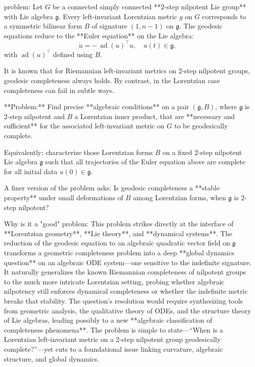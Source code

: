 problem:  
Let \(G\) be a connected simply connected **2-step nilpotent Lie group** with Lie algebra \(\mathfrak{g}\).  
Every left-invariant Lorentzian metric \(g\) on \(G\) corresponds to a symmetric bilinear form \(B\) of signature \((1, n-1)\) on \(\mathfrak{g}\). The geodesic equations reduce to the **Euler equation** on the Lie algebra:  
\[
\dot{u} = -\,\operatorname{ad}(u)^{\top}u, \quad u(t)\in \mathfrak{g},
\]
with \(\operatorname{ad}(u)^{\top}\) defined using \(B\).  

It is known that for Riemannian left-invariant metrics on 2-step nilpotent groups, geodesic completeness always holds. By contrast, in the Lorentzian case completeness can fail in subtle ways.  

**Problem:**  
Find precise **algebraic conditions** on a pair \((\mathfrak{g}, B)\), where \(\mathfrak{g}\) is 2-step nilpotent and \(B\) a Lorentzian inner product, that are **necessary and sufficient** for the associated left-invariant metric on \(G\) to be geodesically complete.  

Equivalently: characterize those Lorentzian forms \(B\) on a fixed 2-step nilpotent Lie algebra \(\mathfrak{g}\) such that all trajectories of the Euler equation above are complete for all initial data \(u(0)\in \mathfrak{g}\).  

A finer version of the problem asks:  
Is geodesic completeness a **stable property** under small deformations of \(B\) among Lorentzian forms, when \(\mathfrak{g}\) is 2-step nilpotent?

Why is it a "good" problem:  
This problem strikes directly at the interface of **Lorentzian geometry**, **Lie theory**, and **dynamical systems**. The reduction of the geodesic equation to an algebraic quadratic vector field on \(\mathfrak{g}\) transforms a geometric completeness problem into a deep **global dynamics question** on an algebraic ODE system—one sensitive to the indefinite signature. It naturally generalizes the known Riemannian completeness of nilpotent groups to the much more intricate Lorentzian setting, probing whether algebraic nilpotency still enforces dynamical completeness or whether the indefinite metric breaks that stability. The question’s resolution would require synthesizing tools from geometric analysis, the qualitative theory of ODEs, and the structure theory of Lie algebras, leading possibly to a new **algebraic classification of completeness phenomena**. The problem is simple to state—“When is a Lorentzian left-invariant metric on a 2-step nilpotent group geodesically complete?”—yet cuts to a foundational issue linking curvature, algebraic structure, and global dynamics.
